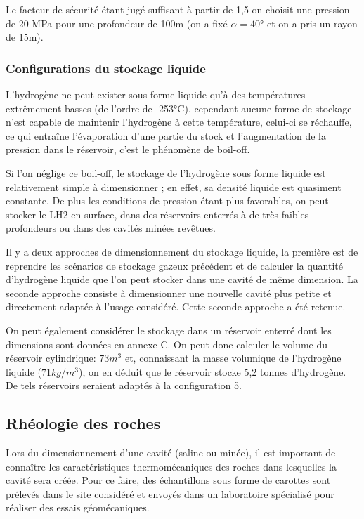\documentclass[11pt,french,a4paper]{article}
\begin{document}
Le facteur de sécurité étant jugé suffisant à partir de 1,5 on choisit une pression de 20 MPa pour une profondeur de 100m (on a fixé $\alpha = 40\textrm{°}$ et on a pris un rayon de 15m).\\

\subsubsection{Configurations du stockage liquide}
L’hydrogène ne peut exister sous forme liquide qu'à des températures extrêmement basses (de l’ordre de -253°C), cependant aucune forme de stockage n’est capable de maintenir l’hydrogène à cette température, celui-ci se réchauffe, ce qui entraîne l’évaporation d’une partie du stock et l’augmentation de la pression dans le réservoir, c’est le phénomène de boil-off.

Si l’on néglige ce boil-off, le stockage de l’hydrogène sous forme liquide est relativement simple à dimensionner ; en effet, sa densité liquide est quasiment constante.
De plus les conditions de pression étant plus favorables, on peut stocker le LH2 en surface, dans des réservoirs enterrés à de très faibles profondeurs ou dans des cavités minées revêtues.

Il y a deux approches de dimensionnement du stockage liquide, la première est de reprendre les scénarios de stockage gazeux précédent et de calculer la quantité d’hydrogène liquide que l’on peut stocker dans une cavité de même dimension. La seconde approche consiste à dimensionner une nouvelle cavité plus petite et directement adaptée à l’usage considéré. Cette seconde approche a été retenue.

On peut également considérer le stockage dans un réservoir enterré dont les dimensions sont données en annexe C. On peut donc calculer le volume du réservoir cylindrique: $73 m^3$ et, connaissant la masse volumique de l’hydrogène liquide ($71 kg/m^3$), on en déduit que le réservoir stocke 5,2 tonnes d’hydrogène. De tels réservoirs seraient adaptés à la configuration 5.



\subsection{Rhéologie des roches}

Lors du dimensionnement d’une cavité (saline ou minée), il est important de connaître les caractéristiques thermomécaniques des roches dans lesquelles la cavité sera créée. Pour ce faire, des échantillons sous forme de carottes sont prélevés dans le site considéré et envoyés dans un laboratoire spécialisé pour réaliser des essais géomécaniques. \\
 
\end{document}
